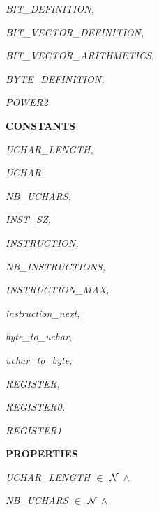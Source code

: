 \begin{sloppypar}
\hspace*{0.20in}\it BIT\_DEFINITION\rm ,

\hspace*{0.20in}\it BIT\_VECTOR\_DEFINITION\rm ,

\hspace*{0.20in}\it BIT\_VECTOR\_ARITHMETICS\rm ,

\hspace*{0.20in}\it BYTE\_DEFINITION\rm ,

\hspace*{0.20in}\it POWER2

\vspace*{4mm}
\bf CONSTANTS

\hspace*{0.20in}\it UCHAR\_LENGTH\rm ,

\hspace*{0.20in}\it UCHAR\rm ,

\hspace*{0.20in}\it NB\_UCHARS\rm ,

\hspace*{0.20in}\it INST\_SZ\rm ,

\hspace*{0.20in}\it INSTRUCTION\rm ,

\hspace*{0.20in}\it NB\_INSTRUCTIONS\rm ,

\hspace*{0.20in}\it INSTRUCTION\_MAX\rm ,

\hspace*{0.20in}\it instruction\_next\rm ,

\hspace*{0.20in}\it byte\_to\_uchar\rm ,

\hspace*{0.20in}\it uchar\_to\_byte\rm ,

\hspace*{0.20in}\it REGISTER\rm ,

\hspace*{0.20in}\it REGISTER0\rm ,

\hspace*{0.20in}\it REGISTER1

\vspace*{4mm}
\bf PROPERTIES

\hspace*{0.20in}\it UCHAR\_LENGTH  $\in$   $\mbox{${\cal N}$}$   $\land$ 

\hspace*{0.20in}\it NB\_UCHARS  $\in$   $\mbox{${\cal N}$}$   $\land$ 


\end{sloppypar}
